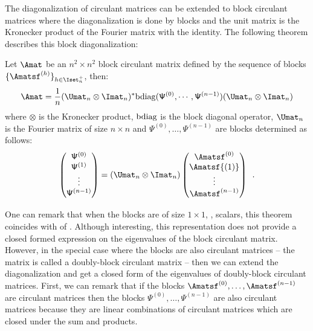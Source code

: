 \noindent
The diagonalization of circulant matrices can be extended to block circulant matrices where the diagonalization is done by blocks and the unit matrix is the Kronecker product of the Fourier matrix with the identity.
The following theorem describes this block diagonalization:
\begin{theorem}
  Let $\Amat$ be an $n^2 \times n^2$ block circulant matrix defined by the sequence of blocks $\{\Amatsf^{(h)}\}_{h \in \Iset^+_n}$, then:
  \begin{equation} \label{equation:ch2-block_diagonalization_block_circulant}
    \Amat = \frac{1}{n} (\Umat_n \otimes \Imat_n)^* \bdiag(\mathsf{\Psi}^{(0)}, \cdots, \mathsf{\Psi}^{(n-1)}) (\Umat_n \otimes \Imat_n)
  \end{equation}
  where $\otimes$ is the Kronecker product, $\mathrm{bdiag}$ is the block diagonal operator, $\Umat_n$ is the Fourier matrix of size $n \times n$ and $\mathsf{\Psi}^{(0)}, \dots, \mathsf{\Psi}^{(n-1)}$ are blocks determined as follows:
  \begin{equation}
    \leftmatrix
      \mathsf{\Psi}^{(0)} \\
      \mathsf{\Psi}^{(1)} \\
      \vdots \\
      \mathsf{\Psi}^{(n-1)} \\
    \rightmatrix = 
    (\Umat_n \otimes \Imat_n)
    \leftmatrix
      \Amatsf^{(0)} \\
      \Amatsf{(1)} \\
      \vdots \\
      \Amatsf^{(n-1)} \\
    \rightmatrix \enspace.
  \end{equation}
  \removespace
\end{theorem}
\noindent
One can remark that when the blocks are of size $1 \times 1$, \ie, scalars, this theorem coincides with  of .
Although interesting, this representation does not provide a closed formed expression on the eigenvalues of the block circulant matrix.
However, in the special case where the blocks are also circulant matrices -- the matrix is called a doubly-block circulant matrix -- then we can extend the diagonalization and get a closed form of the eigenvalues of doubly-block circulant matrices.
First, we can remark that if the blocks $\Amatsf^{(0)}, \dots, \Amatsf^{(n-1)}$ are circulant matrices then the blocks $\mathsf{\Psi}^{(0)}, \dots, \mathsf{\Psi}^{(n-1)}$ are also circulant matrices because they are linear combinations of circulant matrices which are closed under the sum and products.
